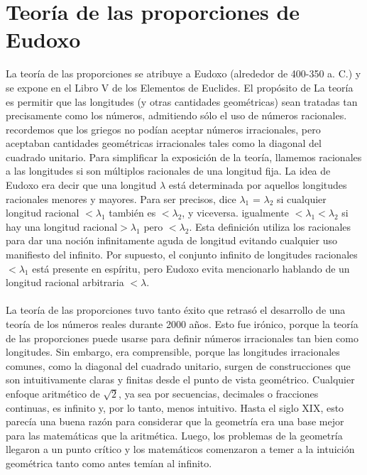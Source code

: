 \documentclass{book}
\begin{document}
    \section{Teoría de las proporciones de Eudoxo}
    La teoría de las proporciones se atribuye a Eudoxo (alrededor de 400-350 a. C.)
    y se expone en el Libro V de los Elementos de Euclides. El propósito de
    La teoría es permitir que las longitudes (y otras cantidades geométricas) sean tratadas
    tan precisamente como los números, admitiendo sólo el uso de números racionales.
    recordemos que los griegos no podían aceptar números irracionales, pero aceptaban cantidades 
    geométricas irracionales tales
    como la diagonal del cuadrado unitario. Para simplificar la exposición de la teoría,
    llamemos racionales a las longitudes si son múltiplos racionales de una longitud fija.
    La idea de Eudoxo era decir que una longitud $\lambda$ está determinada por aquellos
    longitudes racionales menores y mayores. Para ser precisos, dice
    $\lambda_{1}$ = $\lambda_{2}$ si cualquier longitud racional 
    $<\lambda_{1}$  también es $<\lambda_{2}$, y viceversa. igualmente
    $<\lambda_{1}<\lambda_{2}$ si hay una longitud racional$>\lambda_{1}$ pero $<\lambda_{2}$. 
    Esta definición utiliza
    los racionales para dar una noción infinitamente aguda de longitud evitando
    cualquier uso manifiesto del infinito. Por supuesto, el conjunto infinito de longitudes 
    racionales $<\lambda_{1}$
    está presente en espíritu, pero Eudoxo evita mencionarlo hablando de un
    longitud racional arbitraria $<\lambda$. \\ \\ 
    La teoría de las proporciones tuvo tanto éxito que retrasó el desarrollo de una teoría de los 
    números reales durante 2000 años. Esto fue irónico, porque la teoría de las proporciones puede 
    usarse para definir números irracionales tan bien como longitudes. Sin embargo, era comprensible, 
    porque las longitudes irracionales comunes, como la diagonal del cuadrado unitario, surgen de 
    construcciones que son intuitivamente claras y finitas desde el punto de vista geométrico. 
    Cualquier enfoque aritmético de $\sqrt{2}$, ya sea por secuencias, decimales o fracciones continuas, 
    es infinito y, por lo tanto, menos intuitivo. Hasta el siglo XIX, esto parecía una buena razón 
    para considerar que la geometría era una base mejor para las matemáticas que la aritmética.
    Luego, los problemas de la geometría llegaron a un punto crítico y
    los matemáticos comenzaron a temer a la intuición geométrica tanto como antes temían al infinito.
\end{document}

